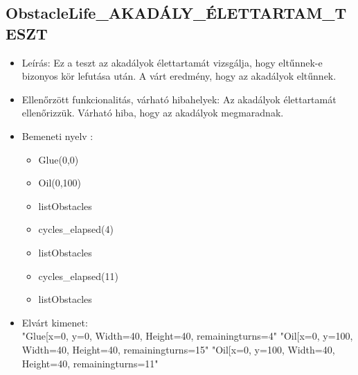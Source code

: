\subsection{ObstacleLife\_AKADÁLY\_ÉLETTARTAM\_TESZT}
\begin{itemize}
	\item Leírás: Ez a teszt az akadályok élettartamát vizsgálja, hogy eltűnnek-e bizonyos kör lefutása után. A várt eredmény, hogy az akadályok eltűnnek.\newline
	\item  Ellenőrzött funkcionalitás, várható hibahelyek: Az akadályok élettartamát ellenőrizzük.
		   Várható hiba, hogy az akadályok megmaradnak.
	\item Bemeneti nyelv :
		\begin{itemize}
		\item Glue(0,0)
		\item Oil(0,100)
		\item listObstacles
		\item cycles\_elapsed(4)
		\item listObstacles
		\item cycles\_elapsed(11)
		\item listObstacles
		\end{itemize}
	
		\item Elvárt kimenet: \\
		"Glue[x=0, y=0, Width=40, Height=40, remainingturns=4"\newline
		"Oil[x=0, y=100, Width=40, Height=40, remainingturns=15"\newline
	    "Oil[x=0, y=100, Width=40, Height=40, remainingturns=11"\newline
			

		
\end{itemize}


\pagebreak
